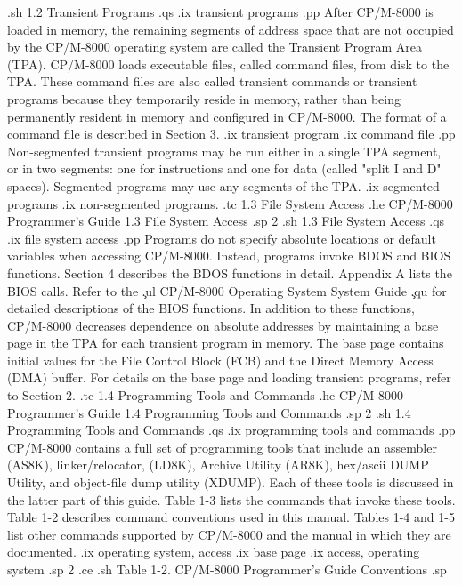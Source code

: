 .sh
1.2 Transient Programs
.qs
.ix transient programs
.pp 
After CP/M-8000 is loaded in memory, the remaining segments of
address space that are not occupied by the CP/M-8000 operating
system are called the Transient Program Area (TPA).  CP/M-8000 loads
executable files, called command files, from disk to the TPA.
These command files are also called transient commands or
transient programs because they temporarily reside in memory, 
rather than being permanently resident in memory and configured in CP/M-8000.  
The format of a command file is described in Section 3. 
.ix transient program
.ix command file
.pp
Non-segmented transient programs may be run either in a single
TPA segment, or in two segments: one for instructions and one for
data (called "split I and D" spaces).  Segmented programs may use
any segments of the TPA.
.ix segmented programs
.ix non-segmented programs.
.tc    1.3  File System Access
.he CP/M-8000 Programmer's Guide               1.3  File System Access
.sp 2
.sh
1.3  File System Access
.qs
.ix file system access
.pp
Programs do not specify absolute locations or default variables
when accessing CP/M-8000.  Instead, programs invoke BDOS and BIOS
functions.  Section 4 describes the BDOS functions in detail.  
Appendix A lists the BIOS calls.  Refer to the \c
.ul
CP/M-8000 Operating System System Guide \c
.qu
for detailed descriptions of the BIOS
functions.  In addition to these functions, CP/M-8000 decreases
dependence on absolute addresses by maintaining a base page in
the TPA for each transient program in memory.  The base page
contains initial values for the File Control Block (FCB) and the
Direct Memory Access (DMA) buffer.  For details on the base page
and loading transient programs, refer to Section 2. 
.tc    1.4  Programming Tools and Commands 
.he CP/M-8000 Programmer's Guide   1.4  Programming Tools and Commands
.sp 2
.sh
1.4  Programming Tools and Commands
.qs
.ix programming tools and commands
.pp
CP/M-8000 contains a full set of programming tools that include an assembler
(AS8K), linker/relocator, (LD8K), Archive Utility (AR8K), 
hex/ascii DUMP Utility, and object-file dump utility (XDUMP).  
Each of these tools is discussed in the
latter part of this guide.  Table 1-3 lists the commands that invoke these 
tools.  Table 1-2 describes command conventions used in this manual.   
Tables 1-4 and 1-5 list other commands supported by CP/M-8000 and the manual
in which they are documented. 
.ix operating system, access
.ix base page
.ix access, operating system
.sp 2
.ce
.sh
Table 1-2.  CP/M-8000 Programmer's Guide Conventions
.sp 
